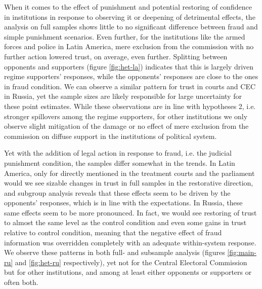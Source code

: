 \documentclass[11pt, ngerman,english,a4]{article}
\begin{document}
When it comes to the effect of punishment and potential restoring of confidence in institutions in response to observing it or deepening of detrimental effects, the analysis on full samples shows little to no significant difference between fraud and simple punishment scenarios. 
Even further, for the institutions like the armed forces and police in Latin America, mere exclusion from the commission with no further action lowered trust, on average, even further. Splitting between opponents and supporters (figure \ref{fig:het-la}) indicates that this is largely driven regime supporters' responses, while the opponents' responses are close to the ones in fraud condition. We can observe a similar pattern for trust in courts and CEC in Russia, yet the sample sizes are likely responsible for large uncertainty for these point estimates. While these observations are in line with hypotheses 2, i.e. stronger spillovers among the regime supporters, for other institutions we only observe slight mitigation of the damage or no effect of mere exclusion from the commission on diffuse support in the institutions of political system.

Yet with the addition of legal action in response to fraud, i.e. the judicial punishment condition, the samples differ somewhat in the trends.
In Latin America, only for directly mentioned in the treatment courts and the parliament would we see sizable changes in trust in full samples in the restorative direction, and subgroup analysis reveals that these effects seem to be driven by the opponents' responses, which is in line with the expectations.  
In Russia, these same effects seem to be more pronounced.
In fact, we would see restoring of trust to almost the same level as the control condition and even some gains in trust relative to control condition, meaning that the negative effect of fraud information was overridden completely with an adequate within-system response. We observe these patterns in both full- and subsample analysis (figures \ref{fig:main-ru} and \ref{fig:het-ru} respectively), yet not for the Central Electoral Commission but for other institutions, and among at least either opponents or supporters or often both. 
\end{document}
